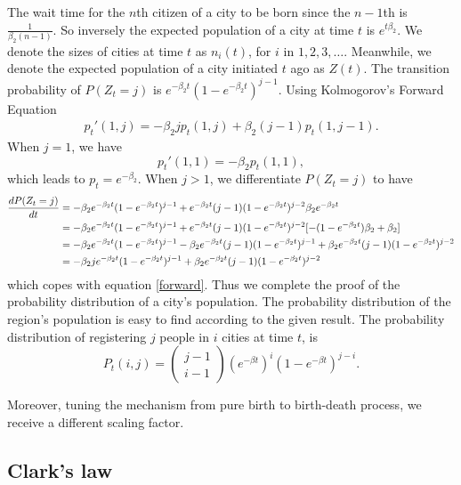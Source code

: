 \documentclass[aps,prl]{revtex4-2}
\begin{document}
The wait time for the $n$th citizen of a city to be born since the $n-1$th is $\frac{1}{\beta_2(n-1)}$. So inversely the expected population of a city at time $t$ is $e^{t\beta_2}$. We denote the sizes of cities at time $t$ as $n_i(t)$, for $i$ in $1,2,3,\dots$. Meanwhile, we denote the expected population of a city initiated $t$ ago as $Z(t)$. The transition probability of $P(Z_t = j)$ is $e^{-\beta_2 t}(1-e^{-\beta_2 t})^{j-1}$. Using Kolmogorov’s Forward Equation
\begin{align}p_t'(1,j) = -\beta_2 j p_t(1,j) + \beta_2 (j-1) p_t(1,j-1).\label{forward}\end{align}  When $j = 1$, we have \[p_t'(1,1) = -\beta_2 p_t(1,1), \] which leads to $p_t=e^{-\beta_2}$. When $j>1$, we differentiate $P(Z_t = j)$ to have 
\begin{align}
	\frac{dP(Z_t = j)}{dt} &= -\beta_2e^{-\beta_2 t} (1-e^{-\beta_2 t})^{j-1} + e^{-\beta_2 t}(j-1)(1-e^{-\beta_2 t})^{j-2}\beta_2 e^{-\beta_2 t}\notag\\
	&= -\beta_2 e^{-\beta_2 t}(1-e^{-\beta_2 t})^{j-1} + e^{-\beta_2 t}(j-1)(1-e^{-\beta_2 t})^{j-2} [-(1-e^{-\beta_2 t})\beta_2+\beta_2]\notag\\
	&= -\beta_2 e^{-\beta_2 t}(1-e^{-\beta_2 t})^{j-1} -\beta_2 e^{-\beta_2 t}(j-1)(1-e^{-\beta_2 t})^{j-1} +\beta_2e^{-\beta_2 t}(j-1)(1-e^{-\beta_2 t})^{j-2}\notag\\
	&= -\beta_2 j e^{-\beta_2 t}(1-e^{-\beta_2 t})^{j-1} +\beta_2e^{-\beta_2 t}(j-1)(1-e^{-\beta_2 t})^{j-2}
\end{align}
which copes with equation \ref{forward}. Thus we complete the proof of the probability distribution of a city's population. The probability distribution of the region's population is easy to find according to the given result. The probability distribution of registering $j$ people in $i$ cities at time $t$, is \[ P_t(i,j) = \left(\begin{array}{c}{j-1} \\ {i-1}\end{array}\right)\left(e^{-\beta t}\right)^{i}\left(1-e^{-\beta t}\right)^{j-i}. \] 

Moreover, tuning the mechanism from pure birth to birth-death process, we receive a different scaling factor.

\subsection{Clark's law}
\end{document}
